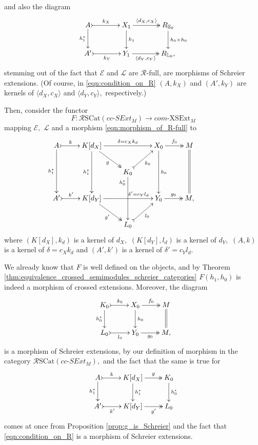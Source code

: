 \documentclass[a4paper]{amsart}
\theoremstyle{plain}
\theoremstyle{definition}
\theoremstyle{remark}
\newcommand{\la}{\langle}
\newcommand{\ra}{\rangle}
\begin{document}
and also the diagram
\begin{equation}
\label{eqn:condition_on_R}
\begin{aligned}
\xymatrixcolsep{3pc}
{\xymatrix{
{A} \ar[d]_-{h^\star_1} \ar@{>->}[r]^-{k_X} &{X_1} \ar[d]^-{h_1} \ar@{->>}[r]^-{\la d_X,c_X\ra} &{R_{{\mathbb{E}}_0}} \ar[d]^-{h_0\times h_0}\\
{A'} \ar@{>->}[r]_-{k_Y} &{Y_1} \ar@{->>}[r]_-{\la d_Y,c_Y\ra} &{R_{{\mathbb{L}}_0},}
}}
\end{aligned}
\end{equation}
stemming out of the fact that $\mathcal{E}$ and $\mathcal{L}$ are $\mathcal{R}$-full, are morphisms of Schreier extensions. (Of course, in \eqref{eqn:condition_on_R} $(A,k_X)$ and $(A',k_Y)$ are kernels of $\la d_X,c_X\ra$ and $\la d_Y,c_Y\ra,$ respectively.)

Then, consider the functor
\begin{equation}
\label{eqn:F}
F\colon\mathcal{R}\mathrm{SCat}(cc\text{-}SExt_M)\longrightarrow com\text{-}\mathrm{XSExt}_M
\end{equation}
mapping $\mathcal{E},$ $\mathcal{L}$ and a morphism \eqref{eqn:morphism_of_R-full} to
\begin{equation*}
\xymatrixrowsep{1.8pc}
\xymatrix{
A \ar[dd]_-{h^\star_1} \ar@{>->}[r]^-k &{K[d_X]} \ar[dd]_-{h^\star_1} \ar@{->>}[rd]_-{g} \ar[rr]^-{\delta=c_Xk_d} & \ &{X_0}  \ar[dd]^-{h_0} \ar@{->>}[r]^-{f_0} &{M}  \ar@{=}[dd] \\
 &\ &{K_0} \ar[dd]_(.20){h^\star_0} \ar@{>->}[ru]_-{k_0}&\ &\ &\ \\
{A'} \ar@{>->}[r]^-{k'} &{K[d_Y]} \ar@{->>}[rd]_-{g'} \ar[rr]^(.70){\delta'=c_Yl_d} & \ &{Y_0} \ar@{->>}[r]^-{g_0} &{M,} \\
 &\ &{L_0} \ar@{>->}[ru]_-{l_0}&\ &\ &\
}
\end{equation*}
where $(K[d_X],k_d)$ is a kernel of $d_X,$ $(K[d_Y],l_d)$ is a kernel of $d_Y,$ $(A,k)$ is a kernel of $\delta=c_Xk_d$ and $(A',k')$ is a kernel of $\delta'=c_Yl_d.$

We already know that $F$ is well defined on the objects, and by Theorem \ref{thm:equivalence_crossed_semimodules_schreier_categories} $F(h_1,h_0)$ is indeed a morphism of crossed extensions. Moreover, the diagram
\begin{equation*}
{\xymatrix{
{K_0} \ar[d]_-{h^\star_0} \ar@{>->}[r]^-{k_0} &{X_0} \ar[d]^-{h_0} \ar@{->>}[r]^-{f_0} &M \ar@{=}[d]\\
{L_0} \ar@{>->}[r]_-{l_0} &{Y_0} \ar@{->>}[r]_-{g_0} &{M,}
}}
\end{equation*}
is a morphism of Schreier extensions, by our definition of morphism in the category $\mathcal{R}\mathrm{SCat}(cc\text{-}SExt_M),$ and the fact that the same is true for
\begin{equation*}
{\xymatrix{
{A} \ar[d]_-{h^\star_1} \ar@{>->}[r]^-{k} &{K[d_X]} \ar[d]^-{h^\star_1} \ar@{->>}[r]^-{g} &{K_0} \ar[d]^-{h^\star_0}\\
{A'} \ar@{>->}[r]_-{k'} &{K[d_Y]} \ar@{->>}[r]_-{g'} &{L_0}
}}
\end{equation*}
comes at once from Proposition \ref{prop:g_is_Schreier} and the fact that \eqref{eqn:condition_on_R} is a morphism of Schreier extensions.
\end{document}
